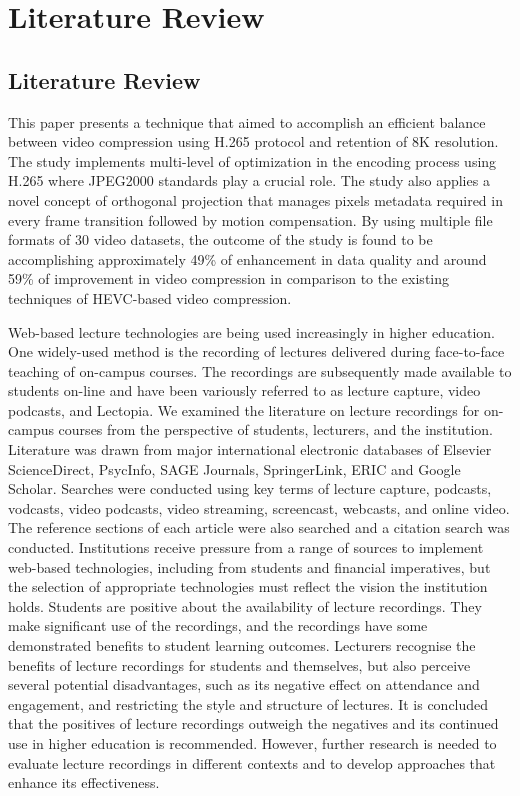 
\chapter{Literature Review} %
\label{Chapter2}

\section{Literature Review}
This paper presents a technique that aimed to accomplish an efficient balance between video compression using H.265 protocol and retention of 8K resolution. The study implements multi-level of optimization in the encoding process using H.265 where JPEG2000 standards play a crucial role. The study also applies a novel concept of orthogonal projection that manages pixels metadata required in every frame transition followed by motion compensation. By using multiple file formats of 30 video datasets, the outcome of the study is found to be accomplishing approximately 49\% of enhancement in data quality and around 59\% of improvement in video compression in comparison to the existing techniques of HEVC-based video compression.\cite{Murthy2016}


Web-based lecture technologies are being used increasingly in higher education. One widely-used method is the recording of lectures delivered during face-to-face teaching of on-campus courses. The recordings are subsequently made available to students on-line and have been variously referred to as lecture capture, video podcasts, and Lectopia. We examined the literature on lecture recordings for on-campus courses from the perspective of students, lecturers, and the institution. Literature was drawn from major international electronic databases of Elsevier ScienceDirect, PsycInfo, SAGE Journals, SpringerLink, ERIC and Google Scholar. Searches were conducted using key terms of lecture capture, podcasts, vodcasts, video podcasts, video streaming, screencast, webcasts, and online video. The reference sections of each article were also searched and a citation search was conducted. Institutions receive pressure from a range of sources to implement web-based technologies, including from students and financial imperatives, but the selection of appropriate technologies must reflect the vision the institution holds. Students are positive about the availability of lecture recordings. They make significant use of the recordings, and the recordings have some demonstrated benefits to student learning outcomes. Lecturers recognise the benefits of lecture recordings for students and themselves, but also perceive several potential disadvantages, such as its negative effect on attendance and engagement, and restricting the style and structure of lectures. It is concluded that the positives of lecture recordings outweigh the negatives and its continued use in higher education is recommended. However, further research is needed to evaluate lecture recordings in different contexts and to develop approaches that enhance its effectiveness.\cite{OCallaghan2017}


